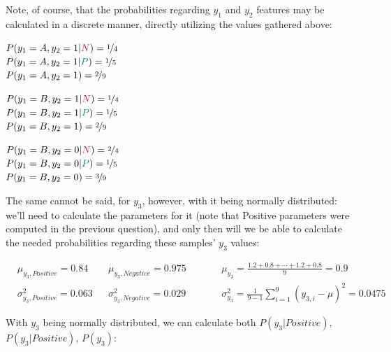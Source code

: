 \documentclass[12pt]{article}
\begin{document}
\begin{enumerate}[leftmargin=\labelsep]
        Note, of course, that the probabilities regarding $y_1$ and $y_2$ features may
        be calculated in a discrete manner, directly utilizing the values gathered above:

        \begin{multicols}{3}
          \setlength{\columnseprule}{1pt}
          \def\columnseprulecolor{\color{black}}

          $P(y_1 = A, y_2 = 1 | \textcolor{purple}{N}) = \nicefrac{1}{4}$ \\
          $P(y_1 = A, y_2 = 1 | \textcolor{teal}{P}) = \nicefrac{1}{5}$ \\
          $P(y_1 = A, y_2 = 1) = \nicefrac{2}{9}$

          \columnbreak

          $P(y_1 = B, y_2 = 1 | \textcolor{purple}{N}) = \nicefrac{1}{4}$ \\
          $P(y_1 = B, y_2 = 1 | \textcolor{teal}{P}) = \nicefrac{1}{5}$ \\
          $P(y_1 = B, y_2 = 1) = \nicefrac{2}{9}$

          \columnbreak

          $P(y_1 = B, y_2 = 0 | \textcolor{purple}{N}) = \nicefrac{2}{4}$ \\
          $P(y_1 = B, y_2 = 0 | \textcolor{teal}{P}) = \nicefrac{1}{5}$ \\
          $P(y_1 = B, y_2 = 0) = \nicefrac{3}{9}$

        \end{multicols}

        The same cannot be said, for $y_3$, however, with it being normally distributed:
        we'll need to calculate the parameters for it (note that Positive parameters were computed in the
        previous question), and only then will we be able to calculate the needed probabilities regarding
        these samples' $y_3$ values:

        $$
          \begin{aligned}
             & \mu_{y_3, Positive} = 0.84       &  & \mu_{y_3, Negative} = 0.975      &  & \qquad \mu_{y_3} = \frac{1.2 + 0.8 + \cdots + 1.2 + 0.8}{9} = 0.9                  \\
             & \sigma_{y_3, Positive}^2 = 0.063 &  & \sigma_{y_3, Negative}^2 = 0.029 &  & \qquad \sigma_{y_3}^2 = \frac{1}{9 - 1} \sum_{i=1}^{9} (y_{3, i} - \mu)^2 = 0.0475
          \end{aligned}
        $$

        With $y_3$ being normally distributed, we can calculate both $P(y_3 | Positive)$, $P(y_3 | Positive)$, $P(y_3)$:


\end{enumerate}
\end{document}
